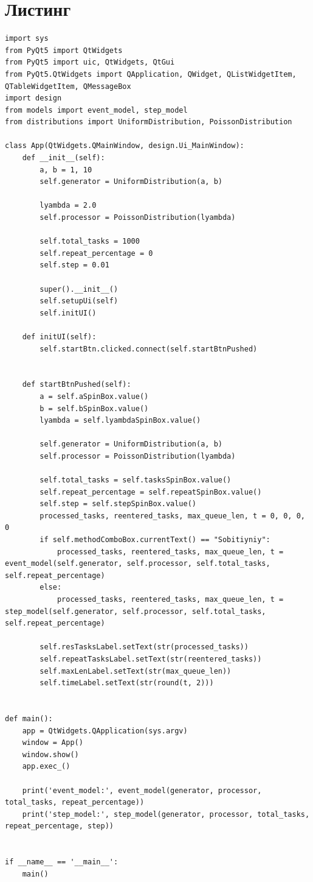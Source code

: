 \documentclass[14pt, a4paper]{extarticle}
\begin{document}
\section*{Листинг}
\begin{lstlisting}[caption=main.py]
import sys
from PyQt5 import QtWidgets
from PyQt5 import uic, QtWidgets, QtGui
from PyQt5.QtWidgets import QApplication, QWidget, QListWidgetItem,  QTableWidgetItem, QMessageBox
import design
from models import event_model, step_model
from distributions import UniformDistribution, PoissonDistribution

class App(QtWidgets.QMainWindow, design.Ui_MainWindow):
	def __init__(self):
		a, b = 1, 10
		self.generator = UniformDistribution(a, b)
		
		lyambda = 2.0
		self.processor = PoissonDistribution(lyambda)
		
		self.total_tasks = 1000
		self.repeat_percentage = 0
		self.step = 0.01
		
		super().__init__()
		self.setupUi(self)
		self.initUI()
	
	def initUI(self):
		self.startBtn.clicked.connect(self.startBtnPushed)
	
	
	def startBtnPushed(self):
		a = self.aSpinBox.value()
		b = self.bSpinBox.value()
		lyambda = self.lyambdaSpinBox.value()
		
		self.generator = UniformDistribution(a, b)
		self.processor = PoissonDistribution(lyambda)
		
		self.total_tasks = self.tasksSpinBox.value()
		self.repeat_percentage = self.repeatSpinBox.value()
		self.step = self.stepSpinBox.value()
		processed_tasks, reentered_tasks, max_queue_len, t = 0, 0, 0, 0
		if self.methodComboBox.currentText() == "Sobitiyniy":
			processed_tasks, reentered_tasks, max_queue_len, t = event_model(self.generator, self.processor, self.total_tasks, self.repeat_percentage)
		else:
			processed_tasks, reentered_tasks, max_queue_len, t = step_model(self.generator, self.processor, self.total_tasks, self.repeat_percentage)
		
		self.resTasksLabel.setText(str(processed_tasks))
		self.repeatTasksLabel.setText(str(reentered_tasks))
		self.maxLenLabel.setText(str(max_queue_len))
		self.timeLabel.setText(str(round(t, 2)))


def main():
	app = QtWidgets.QApplication(sys.argv)
	window = App()
	window.show()
	app.exec_()
	
	print('event_model:', event_model(generator, processor, total_tasks, repeat_percentage))
	print('step_model:', step_model(generator, processor, total_tasks, repeat_percentage, step))


if __name__ == '__main__':
	main()

\end{lstlisting}
\end{document}
